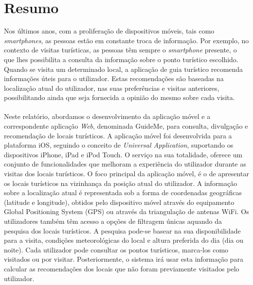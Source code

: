\chapter*{Resumo}
\iffalse
{} 
Nos últimos anos, com a proliferação de dispositivos móveis, tais como \textit{smartphones}, as pessoas estão em constante troca de informação. Por exemplo, no contexto de visitas turísticas, as pessoas têm sempre o \textit{smartphone} presente, o que lhes possibilita a consulta da informação sobre o ponto turístico escolhido. Quando se visita um determinado local, a aplicação de guia turístico recomenda informações úteis para o utilizador. Estas recomendações são baseadas na localização atual do utilizador, nas suas preferências e visitas anteriores, possibilitando ainda que seja fornecida a opinião do mesmo sobre cada visita.\\
\\
Neste relatório, abordamos o desenvolvimento da aplicação móvel e a correspondente aplicação \textit{Web}, denominada GuideMe, para consulta, divulgação e recomendação de locais turísticos. A aplicação móvel foi desenvolvida para a plataforma iOS, seguindo o conceito de \textit{Universal Application}, suportando os dispositivos iPhone, iPad e iPod Touch. O serviço na sua totalidade, oferece um conjunto de funcionalidades que melhoram a experiência do utilizador durante as visitas dos locais turísticos. O foco principal da aplicação móvel, é o de apresentar os locais turísticos na vizinhança da posição atual do utilizador. A informação sobre a localização atual é representada sob a forma de coordenadas geográficas (latitude e longitude), obtidos pelo dispositivo móvel através do equipamento Global Positioning System (GPS) ou através da triangulação de antenas WiFi. Os utilizadores também têm acesso a opções de filtragem únicas aquando da pesquisa dos locais turísticos. A pesquisa pode-se basear na sua disponibilidade para a visita, condições meteorológicas do local e altura preferida do dia (dia ou noite). Cada utilizador pode consultar os pontos turísticos, marca-los como visitados ou por visitar. Posteriormente, o sistema irá usar esta informação para calcular as recomendações dos locais que não foram previamente visitados pelo utilizador.\\
\\
